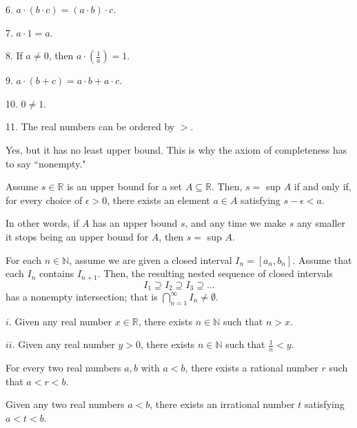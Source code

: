 \documentclass{article}
\begin{document}
    6. $a \cdot (b \cdot c) = (a \cdot b) \cdot c$.
    
    7. $a \cdot 1 = a$.
    
    8. If $a \neq 0$, then $a \cdot (\frac 1 a) = 1$.
    
    9. $a \cdot (b + c) = a \cdot b + a \cdot c$.
    
    10. $0 \neq 1$.
    
    11. The real numbers can be ordered by $>$.

\medskip
{}

    Yes, but it has no least upper bound. This is why the axiom of completeness has to say ``nonempty."

\medskip
{}

    Assume $s \in \mathbb R$ is an upper bound for a set $A \subseteq \mathbb R$. Then, $s =$ sup $A$ if and only if, for every choice of $\epsilon > 0$, there exists an element $a \in A$ satisfying $s - \epsilon < a$.
    
    In other words, if $A$ has an upper bound $s$, and any time we make $s$ any smaller it stops being an upper bound for $A$, then $s=$ sup $A$.

\medskip
{}

    For each $n \in \mathbb N$, assume we are given a closed interval $I_n = [a_n, b_n]$. Assume that each $I_n$ contains $I_{n+1}$. Then, the resulting nested sequence of closed intervals $$I_1 \supseteq I_2 \supseteq I_3 \supseteq \hdots$$ has a nonempty intersection; that is $\bigcap\limits_{n=1}^\infty I_n \neq \emptyset$.
    
\medskip
{}

    $i$. Given any real number $x \in \mathbb R$, there exists $n \in \mathbb N$ such that $n > x$.
    
    $ii$. Given any real number $y > 0$, there exists $n \in \mathbb N$ such that $\frac 1 n < y$.

\medskip
{}

    For every two real numbers $a, b$ with $a < b$, there exists a rational number $r$ such that $a < r < b$.

\medskip
{}

    Given any two real numbers $a < b$, there exists an irrational number $t$ satisfying $a < t < b$.
\end{document}
